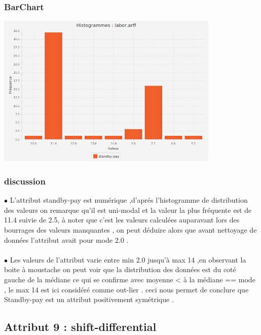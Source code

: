 \documentclass[12pt,a4paper,oneside]{book}
\begin{document}
\subsubsection{BarChart}
\begin{center}
	\includegraphics[width=0.8\textwidth]{screens/barchart/standby-pay-barchart.png}%
	\label{labelname}%
\end{center}

\subsubsection{discussion}
$\bullet$ L'attribut standby-pay est numérique ,d'aprés l'histogramme de distribution des valeurs on remarque qu'il est uni-modal et la valeur la plus fréquente est de 11.4 suivie de 2.5, à noter que c'est les valeurs calculées auparavant lors des bourrages des valeurs manquantes , on peut déduire alors que avant nettoyage de données l'attribut avait pour mode 2.0 .\\
\textbf{ }\\
$\bullet$ Les valeurs de l'attribut varie entre min 2.0 jusqu'à max 14 ,en observant la boite à moustache on peut voir que la distribution des données est du coté gauche de la médiane ce qui se confirme avec moyenne < à la médiane == mode , le max 14 est ici considéré comme out-lier .
ceci nous permet de conclure que Standby-pay est un attribut positivement symétrique .

\newpage


\subsection{Attribut 9 : shift-differential }
\end{document}
